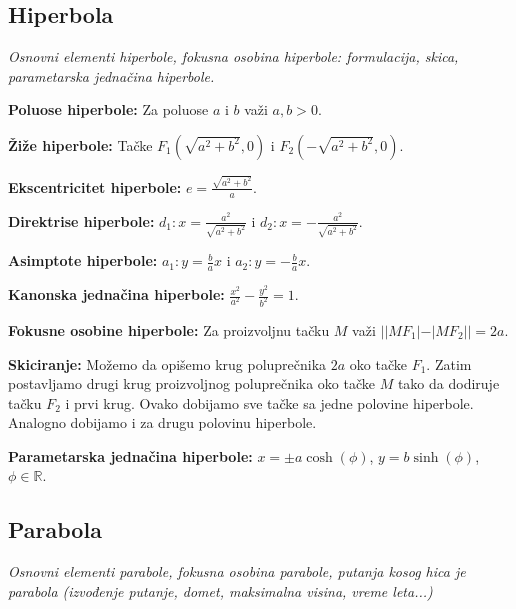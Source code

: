\documentclass[12pt]{article}
\begin{document}
\subsection{Hiperbola}
\textit{Osnovni elementi hiperbole, fokusna osobina hiperbole: formulacija,
    skica, parametarska jednačina hiperbole.}
\par
\vspace*{1cm}

\textbf{Poluose hiperbole:} Za poluose $a$ i $b$ važi $a,b>0$.
\par

\textbf{Žiže hiperbole:} Tačke $F_1(\sqrt{a^2+b^2},0)$ i $F_2(-\sqrt{a^2+b^2},0)$.
\par

\textbf{Ekscentricitet hiperbole:} $e=\frac{\sqrt{a^2+b^2}}{a}$.
\par

\textbf{Direktrise hiperbole:} $d_1: x=\frac{a^2}{\sqrt{a^2+b^2}}$ i
$d_2: x=-\frac{a^2}{\sqrt{a^2+b^2}}$.
\par

\textbf{Asimptote hiperbole:} $a_1: y=\frac{b}{a}x$ i
$a_2: y=-\frac{b}{a}x$.
\par

\textbf{Kanonska jednačina hiperbole:} $\frac{x^2}{a^2}-\frac{y^2}{b^2}=1$.
\par

\textbf{Fokusne osobine hiperbole:} Za proizvoljnu tačku $M$ važi
$||MF_1|-|MF_2||=2a$.
\par

\textbf{Skiciranje:} Možemo da opišemo krug poluprečnika $2a$ oko tačke $F_1$.
Zatim postavljamo drugi krug proizvoljnog poluprečnika oko tačke $M$ tako da
dodiruje tačku $F_2$ i prvi krug. Ovako dobijamo sve tačke sa jedne polovine
hiperbole. Analogno dobijamo i za drugu polovinu hiperbole.
\par

\textbf{Parametarska jednačina hiperbole:} $x=\pm a\cosh(\phi)$, $y=b\sinh(\phi)$,
$\phi\in\mathbb{R}$.

\subsection{Parabola}
\textit{Osnovni elementi parabole, fokusna osobina parabole, putanja kosog hica
    je parabola (izvođenje putanje, domet, maksimalna visina, vreme leta...)}
\par
\vspace*{1cm}
\end{document}

